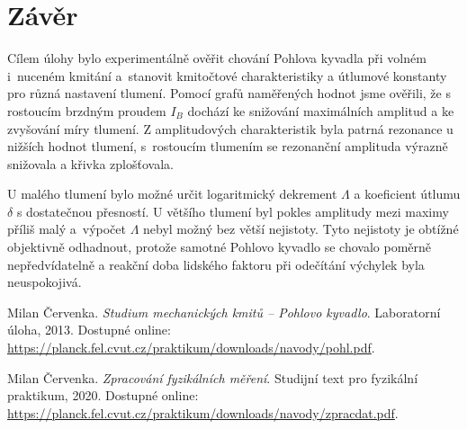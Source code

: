 \documentclass[a4paper,12pt]{article}
\begin{document}
\section{Závěr}
Cílem úlohy bylo experimentálně ověřit chování Pohlova kyvadla při volném i~nuceném kmitání a~stanovit kmitočtové charakteristiky a útlumové konstanty pro různá nastavení tlumení.
Pomocí grafů naměřených hodnot jsme ověřili, že s rostoucím brzdným proudem $I_B$ dochází ke snižování maximálních amplitud a ke zvyšování míry tlumení. Z amplitudových charakteristik byla patrná rezonance u nižších hodnot tlumení, s~rostoucím tlumením se rezonanční amplituda výrazně snižovala a křivka zplošťovala. 

U malého tlumení bylo možné určit logaritmický dekrement $\Lambda$ a koeficient útlumu $\delta$ s dostatečnou přesností. U většího tlumení byl pokles amplitudy mezi maximy příliš malý a~výpočet $\Lambda$ nebyl možný bez větší nejistoty. Tyto nejistoty je obtížné objektivně odhadnout, protože samotné Pohlovo kyvadlo se chovalo poměrně nepředvídatelně a reakční doba lidského faktoru při odečítání výchylek byla neuspokojivá. 

\begin{thebibliography}{}

    Milan Červenka. \textit{Studium mechanických kmitů -- Pohlovo
kyvadlo}. Laboratorní úloha, 2013. Dostupné online: \url{https://planck.fel.cvut.cz/praktikum/downloads/navody/pohl.pdf}.

    Milan Červenka. \textit{Zpracování fyzikálních měření}. Studijní text pro fyzikální praktikum, 2020. Dostupné online: \url{https://planck.fel.cvut.cz/praktikum/downloads/navody/zpracdat.pdf}.

\end{thebibliography}
\end{document}
